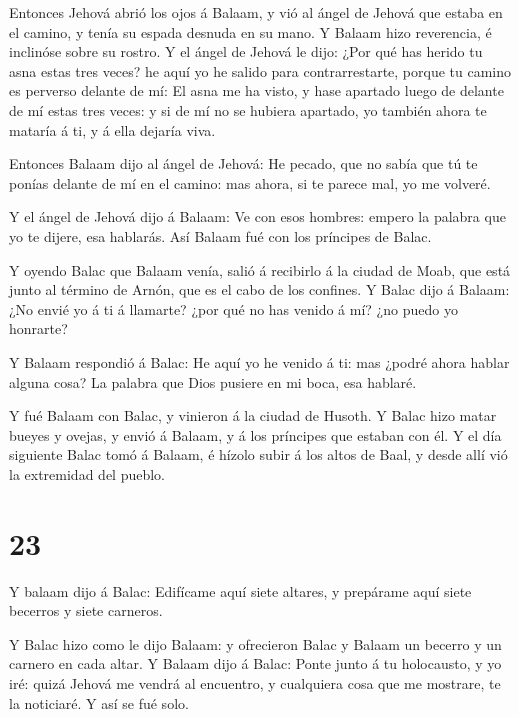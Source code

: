  Entonces Jehová abrió los ojos á Balaam, y vió al ángel de
Jehová que estaba en el camino, y tenía su espada desnuda en su mano. Y
Balaam hizo reverencia, é inclinóse sobre su rostro.  Y el
ángel de Jehová le dijo: ¿Por qué has herido tu asna estas tres veces?
he aquí yo he salido para contrarrestarte, porque tu camino es perverso
delante de mí:  El asna me ha visto, y hase apartado luego
de delante de mí estas tres veces: y si de mí no se hubiera apartado, yo
también ahora te mataría á ti, y á ella dejaría viva.

 Entonces Balaam dijo al ángel de Jehová: He pecado, que no
sabía que tú te ponías delante de mí en el camino: mas ahora, si te
parece mal, yo me volveré.

 Y el ángel de Jehová dijo á Balaam: Ve con esos hombres:
empero la palabra que yo te dijere, esa hablarás. Así Balaam fué con los
príncipes de Balac.

 Y oyendo Balac que Balaam venía, salió á recibirlo á la
ciudad de Moab, que está junto al término de Arnón, que es el cabo de
los confines.  Y Balac dijo á Balaam: ¿No envié yo á ti á
llamarte? ¿por qué no has venido á mí? ¿no puedo yo honrarte?

 Y Balaam respondió á Balac: He aquí yo he venido á ti: mas
¿podré ahora hablar alguna cosa? La palabra que Dios pusiere en mi boca,
esa hablaré.

 Y fué Balaam con Balac, y vinieron á la ciudad de Husoth.
 Y Balac hizo matar bueyes y ovejas, y envió á Balaam, y á
los príncipes que estaban con él.  Y el día siguiente Balac
tomó á Balaam, é hízolo subir á los altos de Baal, y desde allí vió la
extremidad del pueblo.

\hypertarget{section-22}{%
\section{23}\label{section-22}}

 Y balaam dijo á Balac: Edifícame aquí siete altares, y
prepárame aquí siete becerros y siete carneros.

 Y Balac hizo como le dijo Balaam: y ofrecieron Balac y
Balaam un becerro y un carnero en cada altar.  Y Balaam dijo
á Balac: Ponte junto á tu holocausto, y yo iré: quizá Jehová me vendrá
al encuentro, y cualquiera cosa que me mostrare, te la noticiaré. Y así
se fué solo.

